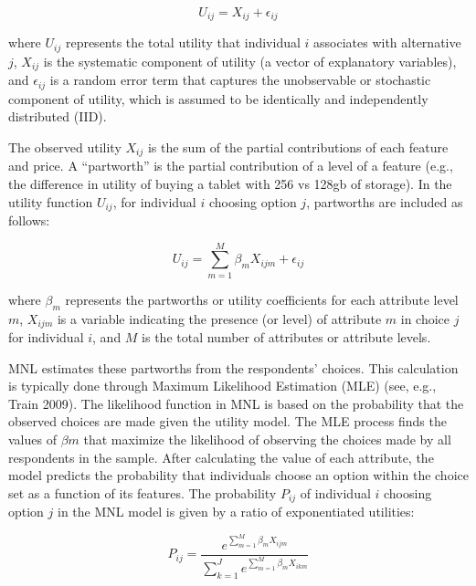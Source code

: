 \documentclass[
  12pt,
]{article}
\begin{document}
\[
U_{ij} = X_{ij} + \epsilon_{ij}
\]

where \(U_{ij}\) represents the total utility that individual \(i\) associates with alternative \(j\), \(X_{ij}\) is the systematic component of utility (a vector of explanatory variables), and \(\epsilon_{ij}\) is a random error term that captures the unobservable or stochastic component of utility, which is assumed to be identically and independently distributed (IID).

The observed utility \(X_{ij}\) is the sum of the partial contributions of each feature and price. A ``partworth'' is the partial contribution of a level of a feature (e.g., the difference in utility of buying a tablet with 256 vs 128gb of storage). In the utility function \(U_{ij}\), for individual \(i\) choosing option \(j\), partworths are included as follows:

\[
U_{ij} = \sum_{m=1}^M \beta_{m} X_{ijm} + \epsilon_{ij}
\]

where \(\beta_{m}\) represents the partworths or utility coefficients for each attribute level \(m\), \(X_{ijm}\) is a variable indicating the presence (or level) of attribute \(m\) in choice \(j\) for individual \(i\), and \(M\) is the total number of attributes or attribute levels.

MNL estimates these partworths from the respondents' choices. This calculation is typically done through Maximum Likelihood Estimation (MLE) (see, e.g., Train 2009). The likelihood function in MNL is based on the probability that the observed choices are made given the utility model. The MLE process finds the values of \(\beta m\) that maximize the likelihood of observing the choices made by all respondents in the sample. After calculating the value of each attribute, the model predicts the probability that individuals choose an option within the choice set as a function of its features. The probability \(P_{ij}\) of individual \(i\) choosing option \(j\) in the MNL model is given by a ratio of exponentiated utilities:

\[
P_{ij} = \frac{e^{\sum_{m=1}^M \beta_{m} X_{ijm}}}{\sum_{k=1}^J e^{\sum_{m=1}^M \beta_{m} X_{ikm}}}
\]
\end{document}
